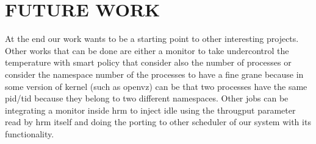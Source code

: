 \documentclass[journal]{IEEEtran}
\begin{document}
\section{FUTURE WORK}
At the end our work wants to be a starting point to other interesting projects. Other works that can be done are either a monitor to take undercontrol the  temperature with smart policy that consider also the number of processes or consider the namespace number of the processes to have a fine grane because in some version of kernel (such as openvz) can be that two processes have the same pid/tid because they belong to two different namespaces. Other jobs can be integrating a monitor inside hrm to inject idle using the througput parameter read by hrm itself and doing the porting to other scheduler of our system with its functionality. 
\end{document}
